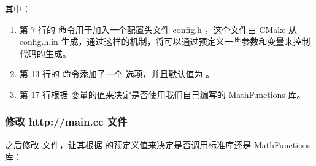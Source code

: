 \documentclass[a4paper,12pt,english]{sphinxmanual}
\begin{document}
\sphinxAtStartPar
其中：
\begin{enumerate}
%
\item {} 
\sphinxAtStartPar
第 7 行的  命令用于加入一个配置头文件 config.h ，这个文件由 CMake 从 config.h.in 生成，通过这样的机制，将可以通过预定义一些参数和变量来控制代码的生成。

\item {} 
\sphinxAtStartPar
第 13 行的  命令添加了一个  选项，并且默认值为  。

\item {} 
\sphinxAtStartPar
第 17 行根据  变量的值来决定是否使用我们自己编写的 MathFunctions 库。

\end{enumerate}


\subsubsection{修改 http://main.cc 文件}
\label{\detokenize{dev-board/cmake:http-main-cc}}
\sphinxAtStartPar
之后修改  文件，让其根据  的预定义值来决定是否调用标准库还是 MathFunctions 库：
\end{document}
